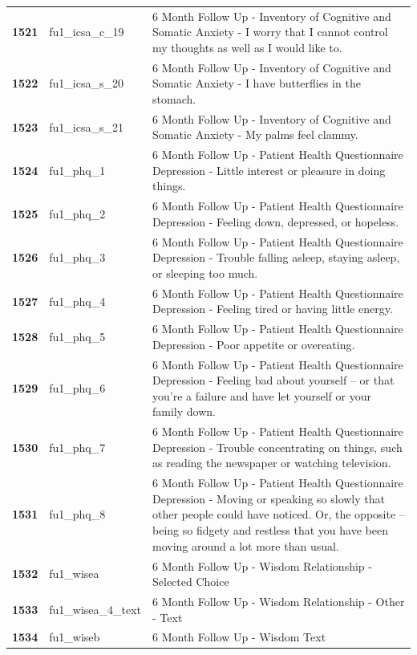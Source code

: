 \documentclass[
  letterpaper,
  DIV=11,
  numbers=noendperiod]{scrartcl}
\begin{document}
\begin{longtable}[t]{>{}cll}
\addlinespace
\textbf{1521} & fu1\_icsa\_c\_19 & 6 Month Follow Up - Inventory of Cognitive and Somatic Anxiety - I worry that I cannot control my thoughts as well as I would like to.\\
\textbf{1522} & fu1\_icsa\_s\_20 & 6 Month Follow Up - Inventory of Cognitive and Somatic Anxiety - I have butterflies in the stomach.\\
\textbf{1523} & fu1\_icsa\_s\_21 & 6 Month Follow Up - Inventory of Cognitive and Somatic Anxiety - My palms feel clammy.\\
\textbf{1524} & fu1\_phq\_1 & 6 Month Follow Up - Patient Health Questionnaire Depression - Little interest or pleasure in doing things.\\
\textbf{1525} & fu1\_phq\_2 & 6 Month Follow Up - Patient Health Questionnaire Depression - Feeling down, depressed, or hopeless.\\
\addlinespace
\textbf{1526} & fu1\_phq\_3 & 6 Month Follow Up - Patient Health Questionnaire Depression - Trouble falling asleep, staying asleep, or sleeping too much.\\
\textbf{1527} & fu1\_phq\_4 & 6 Month Follow Up - Patient Health Questionnaire Depression - Feeling tired or having little energy.\\
\textbf{1528} & fu1\_phq\_5 & 6 Month Follow Up - Patient Health Questionnaire Depression - Poor appetite or overeating.\\
\textbf{1529} & fu1\_phq\_6 & 6 Month Follow Up - Patient Health Questionnaire Depression - Feeling bad about yourself -- or that you're a failure and have let yourself or your family down.\\
\textbf{1530} & fu1\_phq\_7 & 6 Month Follow Up - Patient Health Questionnaire Depression - Trouble concentrating on things, such as reading the newspaper or watching television.\\
\addlinespace
\textbf{1531} & fu1\_phq\_8 & 6 Month Follow Up - Patient Health Questionnaire Depression - Moving or speaking so slowly that other people could have noticed. Or, the opposite -- being so fidgety and restless that you have been moving around a lot more than usual.\\
\textbf{1532} & fu1\_wisea & 6 Month Follow Up - Wisdom Relationship - Selected Choice\\
\textbf{1533} & fu1\_wisea\_4\_text & 6 Month Follow Up - Wisdom Relationship - Other - Text\\
\textbf{1534} & fu1\_wiseb & 6 Month Follow Up - Wisdom Text\\

\end{longtable}
\end{document}

